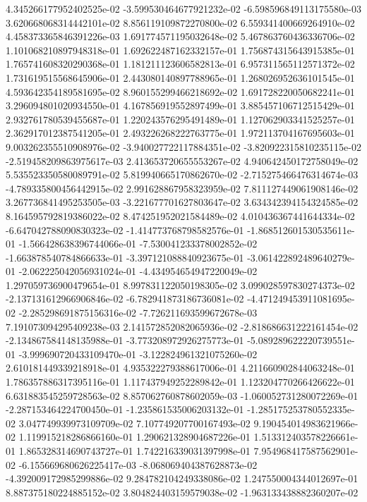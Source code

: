 4.345266177952402525e-02
-3.599530464677921232e-02
-6.598596849113175580e-03
3.620668068314442101e-02
8.856119109872270800e-02
6.559341400669264910e-02
4.458373365846391226e-03
1.691774571195032648e-02
5.467863760436336706e-02
1.101068210897948318e-01
1.692622487162332157e-01
1.756874315643915385e-01
1.765741608320290368e-01
1.181211123606582813e-01
6.957311565112571372e-02
1.731619515568645906e-01
2.443080140897788965e-01
1.268026952636101545e-01
4.593642354189581695e-02
8.960155299466218692e-02
1.691728220050682241e-01
3.296094801020934550e-01
4.167856919552897499e-01
3.885457106712515429e-01
2.932761780539455687e-01
1.220243576295491489e-01
1.127062903341525257e-01
2.362917012387541205e-01
2.493226268222763775e-01
1.972113704167695603e-01
9.003262355510908976e-02
-3.940027722117884351e-02
-3.820922315810235115e-02
-2.519458209863975617e-03
2.413653720655553267e-02
4.940642450172758049e-02
5.535523350580089791e-02
5.819940665170862670e-02
-2.715275466476314674e-03
-4.789335800456442915e-02
2.991628867958323959e-02
7.811127449061908146e-02
3.267736841495253505e-03
-3.221677701627803647e-02
3.634342394154324585e-02
8.164595792819386022e-02
8.474251952021584489e-02
4.010436367441644334e-02
-6.647042788090830323e-02
-1.414773768798582576e-01
-1.868512601530535611e-01
-1.566428638396744066e-01
-7.530041233378002852e-02
-1.663878540784866633e-01
-3.397121088840923675e-01
-3.061422892489640279e-01
-2.062225042056931024e-01
-4.434954654947220049e-02
1.297059736900479654e-01
8.997831122050198305e-02
3.099028597830274373e-02
-2.137131612966906846e-02
-6.782941873186736081e-02
-4.471249453911081695e-02
-2.285298691875156316e-02
-7.726211693599672678e-03
7.191073094295409238e-03
2.141572852082065936e-02
-2.818686631222161454e-02
-2.134867584148135988e-01
-3.773208972926275773e-01
-5.089289622220739551e-01
-3.999690720433109470e-01
-3.122824961321075260e-02
2.610181449339218918e-01
4.935322279388617006e-01
4.211660902844063248e-01
1.786357886317395116e-01
1.117437949252289842e-01
1.123204770266426622e-01
6.631883545259728563e-02
8.857062760878602059e-03
-1.060052731280072269e-01
-2.287153464224700450e-01
-1.235861535006203132e-01
-1.285175253780552335e-02
3.047749939973109709e-02
7.107749207700167493e-02
9.190454014983621966e-02
1.119915218286866160e-01
1.290621328904687226e-01
1.513312403578226661e-01
1.865328314690743727e-01
1.742216339031397998e-01
7.954968417587562901e-02
-6.155669680626225417e-03
-8.068069404387628873e-02
-4.392009172985299886e-02
9.284782104249338086e-02
1.247550004344012697e-01
8.887375180224885152e-02
3.804824403159579038e-02
-1.963133438882360207e-02
